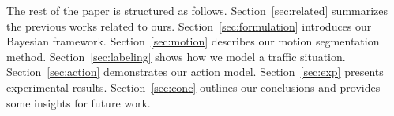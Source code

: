 The rest of the paper is structured as follows. Section~\ref{sec:related}
summarizes the previous works related to ours. Section~\ref{sec:formulation}
introduces our Bayesian framework. Section~\ref{sec:motion} describes our motion
segmentation method. Section~\ref{sec:labeling} shows how we model a traffic
situation. Section~\ref{sec:action} demonstrates our action model.
Section~\ref{sec:exp} presents experimental results. Section~\ref{sec:conc}
outlines our conclusions and provides some insights for future work.
